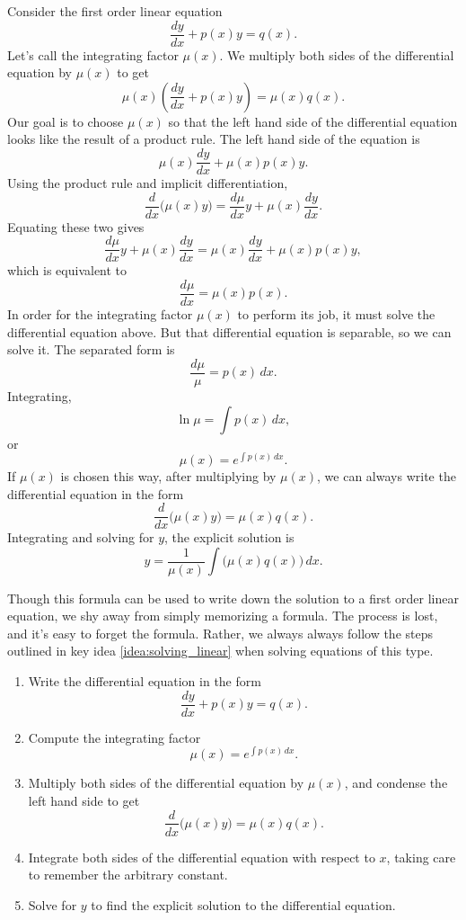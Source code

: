 Consider the first order linear equation
	\[
		\frac{dy}{dx} + p(x)y = q(x).
	\]
Let's call the integrating factor $\mu(x)$.  We multiply both sides of the differential equation by $\mu(x)$ to get
	\[
		\mu(x) \left ( \frac{dy}{dx} + p(x)y \right ) = \mu(x)q(x).
	\]
Our goal is to choose $\mu(x)$ so that the left hand side of the differential equation looks like the result of a product rule.  The left hand side of the equation is
	\[
		\mu(x) \frac{dy}{dx} + \mu(x)p(x)y.
	\]
Using the product rule and implicit differentiation,
	\[
		\frac{d}{dx} \big ( \mu(x) y \big ) = \frac{d\mu}{dx}y + \mu(x)\frac{dy}{dx}.
	\]
Equating these two gives
	\[
		\frac{d\mu}{dx}y + \mu(x)\frac{dy}{dx} = \mu(x) \frac{dy}{dx} + \mu(x)p(x)y,
	\]
which is equivalent to
	\[
		\frac{d\mu}{dx} = \mu(x)p(x).	
	\]
In order for the integrating factor $\mu(x)$ to perform its job, it must solve the differential equation above.  But that differential equation is separable, so we can solve it.  The separated form is
	\[
		\frac{d\mu}{\mu} = p(x)\,dx.
	\]
Integrating,
	\[
		\ln \mu = \int p(x)\,dx,
	\]
or
	\[
		\mu(x) = e^{\int p(x)\,dx}.
	\]
If $\mu(x)$ is chosen this way, after multiplying by $\mu(x)$, we can always write the differential equation in the form
	\[
		\frac{d}{dx} \big( \mu(x)y \big) = \mu(x)q(x).
	\]
Integrating and solving for $y$, the explicit solution is
	\[
		y = \frac{1}{\mu(x)}\int \big( \mu(x)q(x) \big)\,dx.
	\]
	

Though this formula can be used to write down the solution to a first order linear equation, we shy away from simply memorizing a formula. The process is lost, and it's easy to forget the formula. Rather, we always always follow the steps outlined in key idea \ref{idea:solving_linear} when solving equations of this type.

{
\begin{enumerate}
	\item Write the differential equation in the form
		\[
			\frac{dy}{dx} + p(x)y = q(x).
		\]
	\item Compute the integrating factor
		\[
			\mu(x) = e^{\int p(x)\,dx}.
		\]
	\item Multiply both sides of the differential equation by $\mu(x)$, and condense the left hand side to get
		\[
			\frac{d}{dx}\big( \mu(x)y \big) = \mu(x)q(x).
		\]
	\item Integrate both sides of the differential equation with respect to $x$, taking care to remember the arbitrary constant.
	\item Solve for $y$ to find the explicit solution to the differential equation.
\end{enumerate}
}

